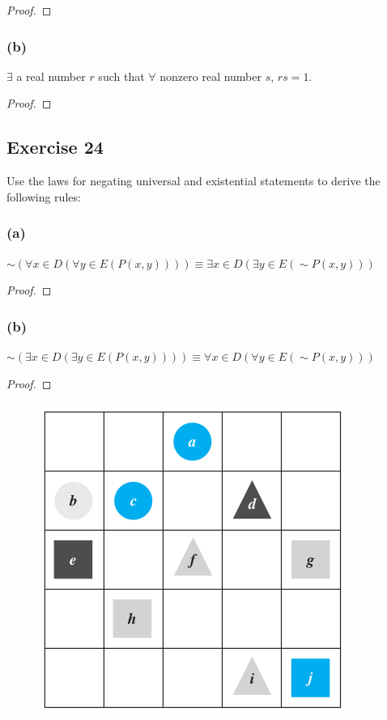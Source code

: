 \documentclass[14pt]{extarticle}
\newcommand{\fa}{\forall}
\newcommand{\te}{\exists}
\begin{document}
\begin{proof}

\end{proof}

\subsubsection{(b)}
$\te$ a real number $r$ such that $\fa$ nonzero real number $s$, $rs = 1$.

\begin{proof}

\end{proof}

\subsection{Exercise 24}
Use the laws for negating universal and existential statements to derive the following rules:

\subsubsection{(a)}
$\sim(\fa x \in D(\fa y \in E(P(x, y)))) \equiv \te x \in D(\te y \in E({\sim P(x, y)}))$

\begin{proof}

\end{proof}

\subsubsection{(b)}
$\sim(\te x \in D(\te y \in E(P(x, y)))) \equiv \fa x \in D(\fa y \in E({\sim P(x, y)}))$

\begin{proof}

\end{proof}

\begin{figure}[ht!]
\centering
\includegraphics[scale=0.4]{../images/3.3.1.png}
\end{figure}
\end{document}
